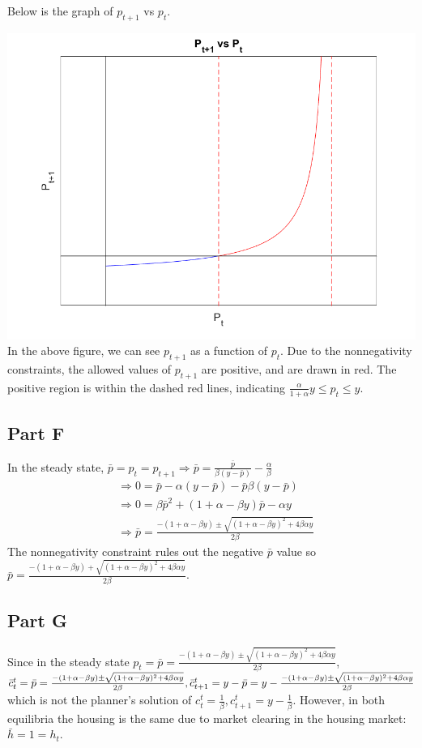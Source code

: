 \documentclass[11pt]{article} %
\begin{document}
Below is the graph of $p_{t+1}$ vs $p_t$. 

\includegraphics{fig1}
In the above figure, we can see $p_{t+1}$ as a function of $p_t$. Due to the nonnegativity constraints, the allowed values of $p_{t+1}$ are positive, and are drawn in red. The positive region is within the dashed red lines, indicating $\frac{\alpha}{1+\alpha}y\leq p_t\leq y$.

\subsection{Part F}
In the steady state, $\bar{p} = p_t = p_{t+1} \Rightarrow \bar{p} = \frac{\bar{p}}{\beta(y-\bar{p})} - \frac{\alpha}{\beta}$
\begin{align*}
&\Rightarrow 0 =\bar{p} - \alpha(y - \bar{p}) - \bar{p}\beta(y - \bar{p})\\
&\Rightarrow 0 = \beta \bar{p}^2 +(1+\alpha - \beta y)\bar{p} - \alpha y \\
&\Rightarrow \bar{p} = \frac{-(1+\alpha - \beta y) \pm \sqrt{(1+\alpha - \beta y)^2 +4\beta \alpha y} }{2\beta} 
\end{align*}
The nonnegativity constraint rules out the negative $\bar{p}$ value so $\bar{p} = \frac{-(1+\alpha - \beta y) + \sqrt{(1+\alpha - \beta y)^2 +4\beta \alpha y} }{2\beta}.$
\subsection{Part G}
Since in the steady state $p_t = \bar{p} =  \frac{-(1+\alpha - \beta y) \pm \sqrt{(1+\alpha - \beta y)^2 +4\beta \alpha y} }{2\beta} $, $\bar{c}_t^t =\bar{p} =  \frac{-(1+\alpha - \beta y) \pm \sqrt{(1+\alpha - \beta y)^2 +4\beta \alpha y} }{2\beta}, \\ \bar{c}_{t+1}^t = y - \bar{p} = y- \frac{-(1+\alpha - \beta y) \pm \sqrt{(1+\alpha - \beta y)^2 +4\beta \alpha y} }{2\beta} $ which is not the planner's solution of $c_t^t = \frac{1}{\beta}, c_{t+1}^t = y - \frac{1}{\beta}$. However, in both equilibria the housing is the same due to market clearing in the housing market: $\bar{h} = 1 = h_t$.
\end{document}
